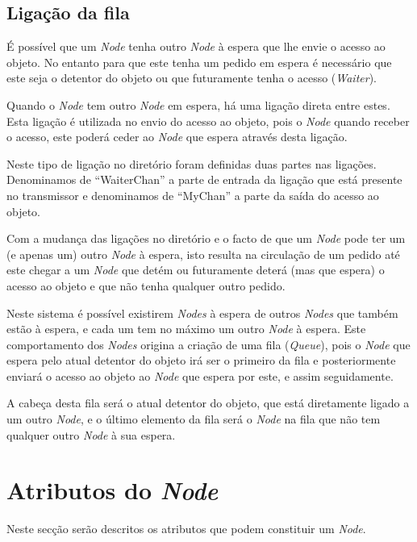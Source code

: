 
\subsection*{Ligação da fila}
É possível que um \emph{Node} tenha outro \emph{Node} à espera que lhe envie o acesso ao objeto. No entanto para que este tenha um pedido em espera é necessário que este seja o detentor do objeto ou que futuramente tenha o acesso (\emph{Waiter}).

Quando o \emph{Node} tem outro \emph{Node} em espera, há uma ligação direta entre estes.
Esta ligação é utilizada no envio do acesso ao objeto, pois o \emph{Node} quando receber o acesso, este poderá ceder ao \emph{Node} que espera através desta ligação.

Neste tipo de ligação no diretório foram definidas duas partes nas ligações. Denominamos de  ``WaiterChan'' a parte de entrada da ligação que está presente no transmissor e denominamos de ``MyChan'' a parte da saída do acesso ao objeto.

Com a mudança das ligações no diretório e o facto de que um \emph{Node} pode ter um (e apenas um) outro \emph{Node} à espera, isto resulta na circulação de um pedido até este chegar a um \emph{Node} que detém ou futuramente deterá (mas que espera) o acesso ao objeto e que não tenha qualquer outro pedido.

Neste sistema é possível existirem \emph{Nodes} à espera de outros \emph{Nodes} que também estão à espera, e cada um tem no máximo um outro \emph{Node} à espera. 
Este comportamento dos \emph{Nodes} origina a criação de uma fila (\emph{Queue}), pois o \emph{Node} que espera pelo atual detentor do objeto irá ser o primeiro da fila e posteriormente enviará o acesso ao objeto ao \emph{Node} que espera por este, e assim seguidamente.

A cabeça desta fila será o atual detentor do objeto, que está diretamente ligado a um outro \emph{Node}, e o último elemento da fila será o \emph{Node} na fila que não tem qualquer outro \emph{Node} à sua espera.




\section{Atributos do \emph{Node}}
\label{especificacao:atr:section}
Neste secção serão descritos os atributos que podem constituir um \emph{Node}.

